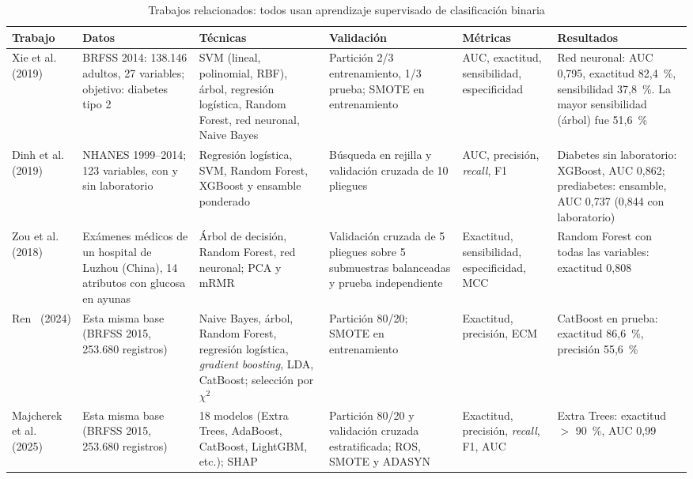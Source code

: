 \documentclass[journal]{IEEEtran}
\begin{document}
\begin{table}[!t]
\caption{Trabajos relacionados: todos usan aprendizaje supervisado de clasificación binaria}
\label{tab:sota}
\centering
\footnotesize
\begin{tabular}{L{1.75cm} L{2.75cm} L{3.0cm} L{3.1cm} L{2.05cm} L{4.2cm}}
\toprule
Trabajo & Datos & Técnicas & Validación & Métricas & Resultados \\
\midrule
Xie et al.~\cite{xie2019} (2019) & BRFSS 2014: 138.146 adultos, 27 variables; objetivo: diabetes tipo 2 & SVM (lineal, polinomial, RBF), árbol, regresión logística, Random Forest, red neuronal, Naive Bayes & Partición 2/3 entrenamiento, 1/3 prueba; SMOTE en entrenamiento & AUC, exactitud, sensibilidad, especificidad & Red neuronal: AUC 0,795, exactitud 82,4~\%, sensibilidad 37,8~\%. La mayor sensibilidad (árbol) fue 51,6~\% \\
Dinh et al.~\cite{dinh2019} (2019) & NHANES 1999--2014; 123 variables, con y sin laboratorio & Regresión logística, SVM, Random Forest, XGBoost y ensamble ponderado & Búsqueda en rejilla y validación cruzada de 10 pliegues & AUC, precisión, \emph{recall}, F1 & Diabetes sin laboratorio: XGBoost, AUC 0,862; prediabetes: ensamble, AUC 0,737 (0,844 con laboratorio) \\
Zou et al.~\cite{zou2018} (2018) & Exámenes médicos de un hospital de Luzhou (China), 14 atributos con glucosa en ayunas & Árbol de decisión, Random Forest, red neuronal; PCA y mRMR & Validación cruzada de 5 pliegues sobre 5 submuestras balanceadas y prueba independiente & Exactitud, sensibilidad, especificidad, MCC & Random Forest con todas las variables: exactitud 0,808 \\
Ren~\cite{ren2024} (2024) & Esta misma base (BRFSS 2015, 253.680 registros) & Naive Bayes, árbol, Random Forest, regresión logística, \emph{gradient boosting}, LDA, CatBoost; selección por $\chi^2$ & Partición 80/20; SMOTE en entrenamiento & Exactitud, precisión, ECM & CatBoost en prueba: exactitud 86,6~\%, precisión 55,6~\% \\
Majcherek et al.~\cite{majcherek2025} (2025) & Esta misma base (BRFSS 2015, 253.680 registros) & 18 modelos (Extra Trees, AdaBoost, CatBoost, LightGBM, etc.); SHAP & Partición 80/20 y validación cruzada estratificada; ROS, SMOTE y ADASYN & Exactitud, precisión, \emph{recall}, F1, AUC & Extra Trees: exactitud $>$ 90~\%, AUC 0,99 \\
\bottomrule
\end{tabular}
\end{table}
\end{document}
